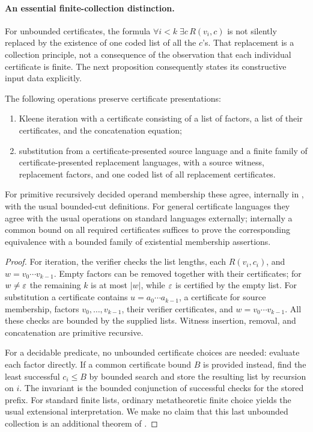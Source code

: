 \paragraph{An essential finite-collection distinction.}
For unbounded certificates, the formula
$\forall i<k\;\exists c\,R(v_i,c)$ is not silently replaced by the
existence of one coded list of all the $c$'s.  That replacement is a
collection principle, not a consequence of the observation that each
individual certificate is finite.  The next proposition consequently
states its constructive input data explicitly.

\begin{proposition}
\label{eff:certified-star}
The following operations preserve certificate presentations:
\begin{enumerate}
\item Kleene iteration with a certificate consisting of a list of factors,
a list of their certificates, and the concatenation equation;
\item substitution from a certificate-presented source language and a
finite family of certificate-presented replacement languages, with a
source witness, replacement factors, and one coded list of all replacement
certificates.
\end{enumerate}
For primitive recursively decided operand membership these agree, internally
in \ipra, with
the usual bounded-cut definitions.  For general certificate languages
they agree with the usual operations on standard languages externally;
internally a common bound on all required certificates suffices to prove
the corresponding equivalence with a bounded family of existential
membership assertions.
\end{proposition}
\begin{proof}
For iteration, the verifier checks the list lengths, each $R(v_i,c_i)$,
and $w=v_0\cdots v_{k-1}$.  Empty factors can be removed together with their
certificates; for $w\ne\varepsilon$ the remaining $k$ is at most $|w|$, while
$\varepsilon$ is certified by the empty list.  For substitution a certificate
contains $u=a_0\cdots a_{k-1}$, a certificate for source membership,
factors $v_0,\ldots,v_{k-1}$, their verifier certificates, and
$w=v_0\cdots v_{k-1}$.  All these checks are bounded by the supplied lists.
Witness insertion, removal, and concatenation are primitive recursive.

For a decidable predicate, no unbounded certificate choices are needed:
evaluate each factor directly.  If a common certificate bound $B$ is
provided instead, find the least successful $c_i\leq B$ by bounded search
and store the resulting list by recursion on $i$.  The invariant is the
bounded conjunction of successful checks for the stored prefix.  For
standard finite lists, ordinary metatheoretic finite choice yields the
usual extensional interpretation.  We make no claim that this last
unbounded collection is an additional theorem of \ipra.
\end{proof}

